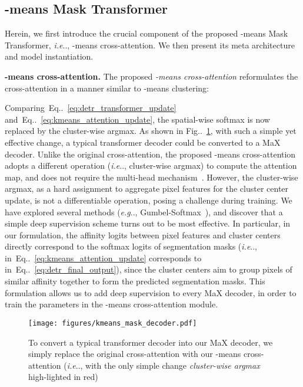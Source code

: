 \documentclass[runningheads]{llncs}
\makeatletter
\DeclareRobustCommand\onedot{\futurelet\@let@token\@onedot}
\def\@onedot{\ifx\@let@token.\else.\null\fi\xspace}
\def\eg{\emph{e.g}\onedot} \def\Eg{\emph{E.g}\onedot}
\def\ie{\emph{i.e}\onedot} \def\Ie{\emph{I.e}\onedot}
\newcommand{\figref}[1]{Fig\onedot~\ref{#1}}
\newcommand{\equref}[1]{Eq\onedot~\eqref{#1}}
\makeatother
\begin{document}
\subsection{-means Mask Transformer}
Herein, we first introduce the crucial component of the proposed -means Mask Transformer, \ie, -means cross-attention. We then present its meta architecture and model instantiation.

{\bf -means cross-attention.}\quad
The proposed \textit{-means cross-attention} reformulates the cross-attention in a manner similar to -means clustering:


Comparing~\equref{eq:detr_transformer_update} and~\equref{eq:kmeans_attention_update}, the spatial-wise softmax is now replaced by the cluster-wise argmax.
As shown in \figref{fig:kmeans_mask_decoder}, with such a simple yet effective change, a typical transformer decoder could be converted to a MaX decoder. 
Unlike the original cross-attention, the proposed -means cross-attention adopts a different operation (\ie, cluster-wise argmax) to compute the attention map, and does not require the multi-head mechanism~\cite{vaswani2017attention}.
However, the cluster-wise argmax, as a hard assignment to aggregate pixel features for the cluster center update, is not a differentiable operation, posing a challenge during training. We have explored several methods (\eg, Gumbel-Softmax~\cite{jang2017categorical}), and discover that a simple deep supervision scheme turns out to be most effective. In particular, in our formulation, the affinity logits between pixel features and cluster centers directly correspond to the softmax logits of segmentation masks (\ie,  in~\equref{eq:kmeans_attention_update} corresponds to  in~\equref{eq:detr_final_output}), since the cluster centers aim to group pixels of similar affinity together to form the predicted segmentation masks. This formulation allows us to add deep supervision to every MaX decoder, in order to train the parameters in  the -means cross-attention module.

\begin{figure}[!t]
    \centering
    \texttt{[image: figures/kmeans\_mask\_decoder.pdf]}
    \caption{
    To convert a typical transformer decoder into our MaX decoder, we simply replace the original cross-attention with our -means cross-attention (\ie, with the only simple change \textit{cluster-wise argmax} high-lighted in red)
    }
    \label{fig:kmeans_mask_decoder}
\end{figure}
\end{document}
